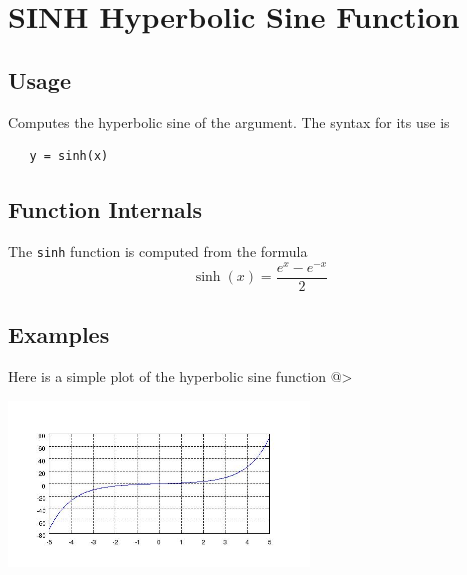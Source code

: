 \section{SINH Hyperbolic Sine Function}

\subsection{Usage}

Computes the hyperbolic sine of the argument.
The syntax for its use is
\begin{verbatim}
   y = sinh(x)
\end{verbatim}
\subsection{Function Internals}

The \verb|sinh| function is computed from the formula
\[
   \sinh(x) = \frac{e^x-e^{-x}}{2}
\]
\subsection{Examples}

Here is a simple plot of the hyperbolic sine function
@>


\centerline{\includegraphics[width=8cm]{sinhplot}}

